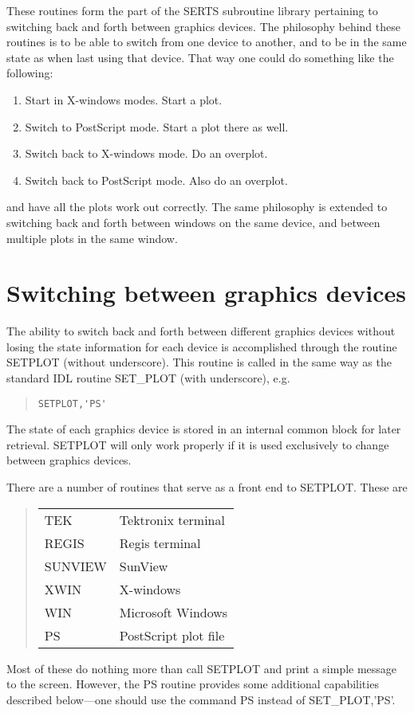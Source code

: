These routines form the part of the SERTS subroutine library pertaining to
switching back and forth between graphics devices.  The philosophy behind these
routines is to be able to switch from one device to another, and to be in the
same state as when last using that device.  That way one could do something
like the following:
\begin{enumerate}
\item
Start in X-windows modes.  Start a plot.
\item
Switch to PostScript mode.  Start a plot there as well.
\item
Switch back to X-windows mode.  Do an overplot.
\item
Switch back to PostScript mode.  Also do an overplot.
\end{enumerate}
and have all the plots work out correctly.  The same philosophy is extended to
switching back and forth between windows on the same device, and between
multiple plots in the same window.

\section{Switching between graphics devices}

The ability to switch back and forth between different graphics devices without
losing the state information for each device is accomplished through the
routine SETPLOT (without underscore).  This routine is called in the same way
as the standard IDL routine SET\_PLOT (with underscore), e.g.
\begin{quote}
\begin{verbatim}
SETPLOT,'PS'
\end{verbatim}
\end{quote}
The state of each graphics device is stored in an internal common block for
later retrieval.  SETPLOT will only work properly if it is used exclusively to
change between graphics devices.

There are a number of routines that serve as a front end to SETPLOT.  These are
\begin{quote}
\begin{tabular}{ll}
TEK		& Tektronix terminal\\
REGIS		& Regis terminal\\
SUNVIEW		& SunView\\
XWIN		& X-windows\\
WIN		& Microsoft Windows\\
PS		& PostScript plot file\\
\end{tabular}
\end{quote}
Most of these do nothing more than call SETPLOT and print a simple message to
the screen.  However, the PS routine provides some additional capabilities
described below---one should use the command PS instead of SET\_PLOT,'PS'.


